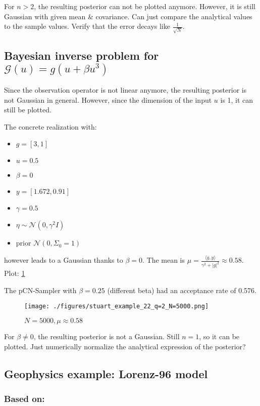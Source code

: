 \documentclass[11pt]{article}
\newcommand{\G}[1]{{\mathcal{G} \left( #1 \right)}}
\newcommand{\N}[2]{\mathcal{N}\left(#1,#2\right)}
\begin{document}
For \(n>2\), the resulting posterior can not be plotted anymore. However, it is still Gaussian
with given mean \& covariance. Can just compare the analytical values to the sample values.
Verify that the error decays like \(\frac{1}{\sqrt{N}}\).
\subsection{Bayesian inverse problem for \(\G{u} = g (u + \beta u^3)\)}
\label{sec:org631c8fd}
Since the observation operator is not linear anymore, the resulting posterior is not
Gaussian in general. However, since the dimension of the input \(u\) is 1, it can
still be plotted.

The concrete realization with:
\begin{itemize}
\item \(g = [3, 1]\)
\item \(u = 0.5\)
\item \(\beta = 0\)
\item \(y= [1.672, 0.91]\)
\item \(\gamma = 0.5\)
\item \(\eta \sim \N{0}{\gamma^2 I}\)
\item prior \(\N{0}{\Sigma_0=1}\)
\end{itemize}
however leads to a Gaussian thanks to \(\beta = 0\). The mean is
\(\mu = \frac{\langle g,y \rangle}{\gamma^2 + |g|^2} \approx 0.58\). Plot: \ref{fig:stuart_22_density}

The pCN-Sampler with \(\beta = 0.25\) (different beta) had an acceptance rate of 0.576.

\begin{figure}[htbp]
\centering
\texttt{[image: ./figures/stuart\_example\_22\_q=2\_N=5000.png]}
\caption{\label{fig:stuart_22_density}
\(N=5000, \mu \approx 0.58\)}
\end{figure}

For \(\beta \neq 0\), the resulting posterior is not a Gaussian. Still \(n=1\), so it can be
plotted. Just numerically normalize the analytical expression of the posterior?
\subsection{Geophysics example: Lorenz-96 model}
\label{sec:orgec05bfa}

\subsubsection{Based on:}
\label{sec:org0fb0770}
\end{document}
